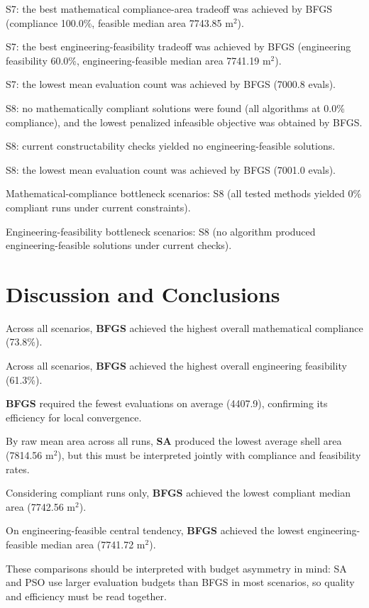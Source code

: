 S7: the best mathematical compliance-area tradeoff was achieved by BFGS (compliance 100.0\%, feasible median area 7743.85 m$^2$).

S7: the best engineering-feasibility tradeoff was achieved by BFGS (engineering feasibility 60.0\%, engineering-feasible median area 7741.19 m$^2$).

S7: the lowest mean evaluation count was achieved by BFGS (7000.8 evals).

S8: no mathematically compliant solutions were found (all algorithms at 0.0\% compliance), and the lowest penalized infeasible objective was obtained by BFGS.

S8: current constructability checks yielded no engineering-feasible solutions.

S8: the lowest mean evaluation count was achieved by BFGS (7001.0 evals).


Mathematical-compliance bottleneck scenarios: S8 (all tested methods yielded 0\% compliant runs under current constraints).

Engineering-feasibility bottleneck scenarios: S8 (no algorithm produced engineering-feasible solutions under current checks).


\chapter{Discussion and Conclusions}


Across all scenarios, \textbf{BFGS} achieved the highest overall mathematical compliance (73.8\%).

Across all scenarios, \textbf{BFGS} achieved the highest overall engineering feasibility (61.3\%).

\textbf{BFGS} required the fewest evaluations on average (4407.9), confirming its efficiency for local convergence.

By raw mean area across all runs, \textbf{SA} produced the lowest average shell area (7814.56 m$^2$), but this must be interpreted jointly with compliance and feasibility rates.

Considering compliant runs only, \textbf{BFGS} achieved the lowest compliant median area (7742.56 m$^2$).

On engineering-feasible central tendency, \textbf{BFGS} achieved the lowest engineering-feasible median area (7741.72 m$^2$).


These comparisons should be interpreted with budget asymmetry in mind: SA and PSO use larger evaluation budgets than BFGS in most scenarios, so quality and efficiency must be read together.



